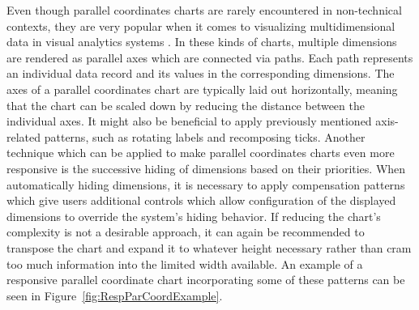 Even though parallel coordinates charts are rarely encountered in non-technical contexts, they are very popular when it comes to visualizing multidimensional data in visual analytics systems \parencite{HighD}.
In these kinds of charts, multiple dimensions are rendered as parallel axes which are connected via paths.
Each path represents an individual data record and its values in the corresponding dimensions.
The axes of a parallel coordinates chart are typically laid out horizontally, meaning that the chart can be scaled down by reducing the distance between the individual axes.
It might also be beneficial to apply previously mentioned axis-related patterns, such as rotating labels and recomposing ticks.
Another technique which can be applied to make parallel coordinates charts even more responsive is the successive hiding of dimensions based on their priorities.
When automatically hiding dimensions, it is necessary to apply compensation patterns which give users additional controls which allow configuration of the displayed dimensions to override the system's hiding behavior.
If reducing the chart's complexity is not a desirable approach, it can again be recommended to transpose the chart and expand it to whatever height necessary rather than cram too much information into the limited width available.
An example of a responsive parallel coordinate chart incorporating some of these patterns can be seen in Figure~\ref{fig:RespParCoordExample}.

